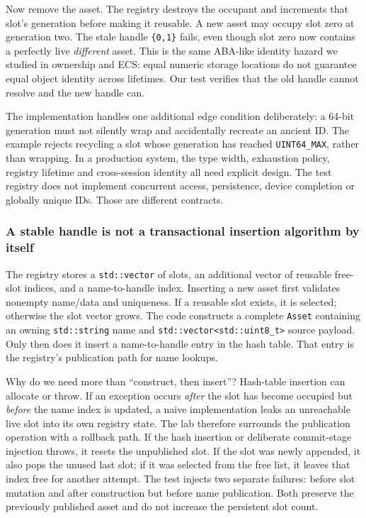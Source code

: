 Now remove the asset. The registry destroys the occupant and increments that slot's generation before making it reusable. A new asset may occupy slot zero at generation two. The stale handle \texttt{\{0,1\}} fails, even though slot zero now contains a perfectly live \emph{different} asset. This is the same ABA-like identity hazard we studied in ownership and ECS: equal numeric storage locations do not guarantee equal object identity across lifetimes. Our test verifies that the old handle cannot resolve and the new handle can.

The implementation handles one additional edge condition deliberately: a 64-bit generation must not silently wrap and accidentally recreate an ancient ID. The example rejects recycling a slot whose generation has reached \texttt{UINT64\_MAX}, rather than wrapping. In a production system, the type width, exhaustion policy, registry lifetime and cross-session identity all need explicit design. The test registry does not implement concurrent access, persistence, device completion or globally unique IDs. Those are different contracts.

\subsubsection{A stable handle is not a transactional insertion algorithm by itself}\label{a-stable-handle-is-not-a-transactional-insertion-algorithm-by-itself}

The registry stores a \texttt{std::vector} of slots, an additional vector of reusable free-slot indices, and a name-to-handle index. Inserting a new asset first validates nonempty name/data and uniqueness. If a reusable slot exists, it is selected; otherwise the slot vector grows. The code constructs a complete \texttt{Asset} containing an owning \texttt{std::string} name and \texttt{std::vector\textless{}std::uint8\_t\textgreater{}} source payload. Only then does it insert a name-to-handle entry in the hash table. That entry is the registry's publication path for name lookups.

Why do we need more than ``construct, then insert''? Hash-table insertion can allocate or throw. If an exception occurs \emph{after} the slot has become occupied but \emph{before} the name index is updated, a naive implementation leaks an unreachable live slot into its own registry state. The lab therefore surrounds the publication operation with a rollback path. If the hash insertion or deliberate commit-stage injection throws, it resets the unpublished slot. If the slot was newly appended, it also pops the unused last slot; if it was selected from the free list, it leaves that index free for another attempt. The test injects two separate failures: before slot mutation and after construction but before name publication. Both preserve the previously published asset and do not increase the persistent slot count.

